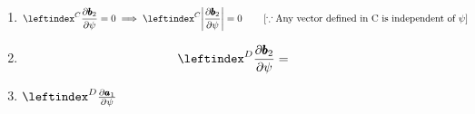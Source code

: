 \begin{enumerate}
 \item
\begin{align*}
    \lx{^C}{\frac {\partial \pmb b_2}  {\partial \psi}} &= 0
    \implies \lx{^C}{\norm{\frac {\partial \pmb b_2}  {\partial \psi}}} = 0
    \qquad \left[ \because \text{Any vector defined in C is independent of } \psi \right]
\end{align*}

 \item
\begin{align*}
    \lx{^D}{\frac {\partial \pmb b_2}  {\partial \psi}} &=
\end{align*}
 \item $\lx{^D}{\frac {\partial \pmb a_1}  {\partial \psi}}$
\end{enumerate}
